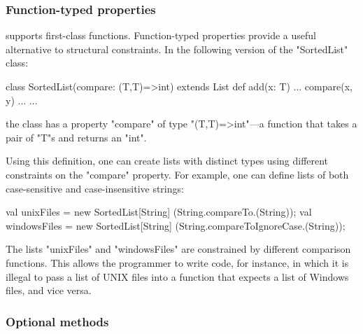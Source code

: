 
\subsubsection{Function-typed properties}

\Xten{} supports first-class functions.
Function-typed properties provide a useful alternative to
structural constraints.  In the
following version of the
\xcd"SortedList" class:
{
\begin{xten}
class SortedList(compare: (T,T)=>int)
  extends List {
    def add(x: T) {... compare(x, y) ...}
    ...
}
\end{xten}}
\noindent
the class has a property \xcd"compare" of type
\xcd"(T,T)=>int"---a function that takes a pair of \xcd"T"s and
returns an \xcd"int".  

Using this definition, one can create lists with distinct types
using different constraints on the \xcd"compare" property.
For example, one can define lists of
both
case-sensitive and case-insensitive strings:
{
\begin{xten}
val unixFiles
  = new SortedList[String]
      (String.compareTo.(String));
val windowsFiles
  = new SortedList[String]
      (String.compareToIgnoreCase.(String));
\end{xten}}

\noindent
The lists \xcd"unixFiles" and \xcd"windowsFiles" are constrained
by different comparison functions.  This allows the programmer
to write code, for instance, in which it is illegal to pass a list of UNIX
files into a function that expects a list of Windows files, and
vice versa.

\subsubsection{Optional methods}

